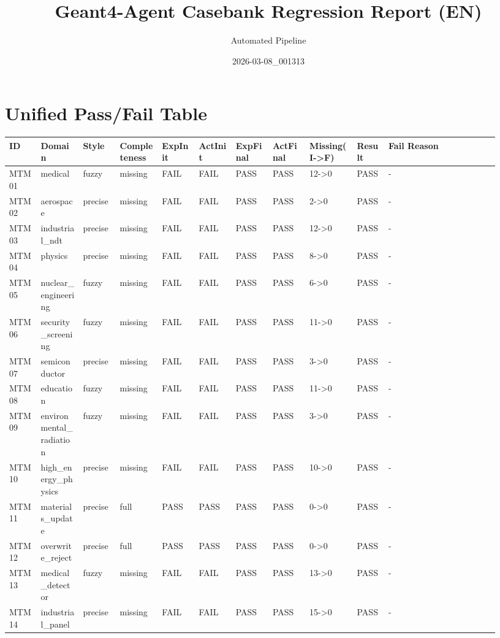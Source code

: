 \documentclass[11pt]{ctexart}
\title{Geant4-Agent Casebank Regression Report (EN)}
\author{Automated Pipeline}
\date{2026-03-08\_001313}
\begin{document}
\maketitle
\section{Unified Pass/Fail Table}
\begin{longtable}{p{0.06\linewidth}p{0.08\linewidth}p{0.07\linewidth}p{0.08\linewidth}p{0.07\linewidth}p{0.07\linewidth}p{0.07\linewidth}p{0.07\linewidth}p{0.09\linewidth}p{0.06\linewidth}p{0.21\linewidth}}
\toprule
ID & Domain & Style & Completeness & ExpInit & ActInit & ExpFinal & ActFinal & Missing(I->F) & Result & Fail Reason \\
\midrule
MTM01 & medical & fuzzy & missing & FAIL & FAIL & PASS & PASS & 12->0 & PASS & - \\
MTM02 & aerospace & precise & missing & FAIL & FAIL & PASS & PASS & 2->0 & PASS & - \\
MTM03 & industrial\_ndt & precise & missing & FAIL & FAIL & PASS & PASS & 12->0 & PASS & - \\
MTM04 & physics & precise & missing & FAIL & FAIL & PASS & PASS & 8->0 & PASS & - \\
MTM05 & nuclear\_engineering & fuzzy & missing & FAIL & FAIL & PASS & PASS & 6->0 & PASS & - \\
MTM06 & security\_screening & fuzzy & missing & FAIL & FAIL & PASS & PASS & 11->0 & PASS & - \\
MTM07 & semiconductor & precise & missing & FAIL & FAIL & PASS & PASS & 3->0 & PASS & - \\
MTM08 & education & fuzzy & missing & FAIL & FAIL & PASS & PASS & 11->0 & PASS & - \\
MTM09 & environmental\_radiation & fuzzy & missing & FAIL & FAIL & PASS & PASS & 3->0 & PASS & - \\
MTM10 & high\_energy\_physics & precise & missing & FAIL & FAIL & PASS & PASS & 10->0 & PASS & - \\
MTM11 & materials\_update & precise & full & PASS & PASS & PASS & PASS & 0->0 & PASS & - \\
MTM12 & overwrite\_reject & precise & full & PASS & PASS & PASS & PASS & 0->0 & PASS & - \\
MTM13 & medical\_detector & fuzzy & missing & FAIL & FAIL & PASS & PASS & 13->0 & PASS & - \\
MTM14 & industrial\_panel & precise & missing & FAIL & FAIL & PASS & PASS & 15->0 & PASS & - \\

\end{longtable}
\end{document}
